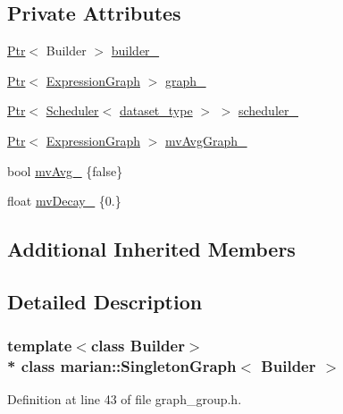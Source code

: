 \subsection*{Private Attributes}
\begin{DoxyCompactItemize}
\item 
\hyperlink{namespacemarian_ad1a373be43a00ef9ce35666145137b08}{Ptr}$<$ Builder $>$ \hyperlink{classmarian_1_1SingletonGraph_ab7a764885f417a8b40b406dde8eddd4f}{builder\+\_\+}
\item 
\hyperlink{namespacemarian_ad1a373be43a00ef9ce35666145137b08}{Ptr}$<$ \hyperlink{classmarian_1_1ExpressionGraph}{Expression\+Graph} $>$ \hyperlink{classmarian_1_1SingletonGraph_af928149755ed8695c3628e3f9299da59}{graph\+\_\+}
\item 
\hyperlink{namespacemarian_ad1a373be43a00ef9ce35666145137b08}{Ptr}$<$ \hyperlink{classmarian_1_1Scheduler}{Scheduler}$<$ \hyperlink{classmarian_1_1SingletonGraph_a6bb5603e1b8641cd65bd7b032cbecefd}{dataset\+\_\+type} $>$ $>$ \hyperlink{classmarian_1_1SingletonGraph_a5ed8cebe3408e9a412c201503a24cffe}{scheduler\+\_\+}
\item 
\hyperlink{namespacemarian_ad1a373be43a00ef9ce35666145137b08}{Ptr}$<$ \hyperlink{classmarian_1_1ExpressionGraph}{Expression\+Graph} $>$ \hyperlink{classmarian_1_1SingletonGraph_a758bb5163433f420a53bcaa36702e19b}{mv\+Avg\+Graph\+\_\+}
\item 
bool \hyperlink{classmarian_1_1SingletonGraph_a0042dd92280399263ed59814f6ddc888}{mv\+Avg\+\_\+} \{false\}
\item 
float \hyperlink{classmarian_1_1SingletonGraph_aa594adad6639933f26d5e50ef8bdb0f5}{mv\+Decay\+\_\+} \{0.\}
\end{DoxyCompactItemize}
\subsection*{Additional Inherited Members}


\subsection{Detailed Description}
\subsubsection*{template$<$class Builder$>$\\*
class marian\+::\+Singleton\+Graph$<$ Builder $>$}



Definition at line 43 of file graph\+\_\+group.\+h.



